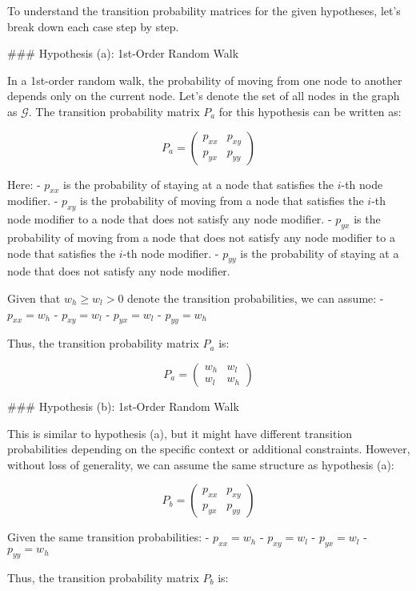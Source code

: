 To understand the transition probability matrices for the given hypotheses, let's break down each case step by step.

### Hypothesis (a): 1st-Order Random Walk

In a 1st-order random walk, the probability of moving from one node to another depends only on the current node. Let's denote the set of all nodes in the graph as \(\mathcal{G}\). The transition probability matrix \(P_a\) for this hypothesis can be written as:

\[ P_a = \begin{pmatrix}
p_{xx} & p_{xy} \\
p_{yx} & p_{yy}
\end{pmatrix} \]

Here:
- \(p_{xx}\) is the probability of staying at a node that satisfies the \(i\)-th node modifier.
- \(p_{xy}\) is the probability of moving from a node that satisfies the \(i\)-th node modifier to a node that does not satisfy any node modifier.
- \(p_{yx}\) is the probability of moving from a node that does not satisfy any node modifier to a node that satisfies the \(i\)-th node modifier.
- \(p_{yy}\) is the probability of staying at a node that does not satisfy any node modifier.

Given that \(w_h \geq w_l > 0\) denote the transition probabilities, we can assume:
- \(p_{xx} = w_h\)
- \(p_{xy} = w_l\)
- \(p_{yx} = w_l\)
- \(p_{yy} = w_h\)

Thus, the transition probability matrix \(P_a\) is:

\[ P_a = \begin{pmatrix}
w_h & w_l \\
w_l & w_h
\end{pmatrix} \]

### Hypothesis (b): 1st-Order Random Walk

This is similar to hypothesis (a), but it might have different transition probabilities depending on the specific context or additional constraints. However, without loss of generality, we can assume the same structure as hypothesis (a):

\[ P_b = \begin{pmatrix}
p_{xx} & p_{xy} \\
p_{yx} & p_{yy}
\end{pmatrix} \]

Given the same transition probabilities:
- \(p_{xx} = w_h\)
- \(p_{xy} = w_l\)
- \(p_{yx} = w_l\)
- \(p_{yy} = w_h\)

Thus, the transition probability matrix \(P_b\) is:

